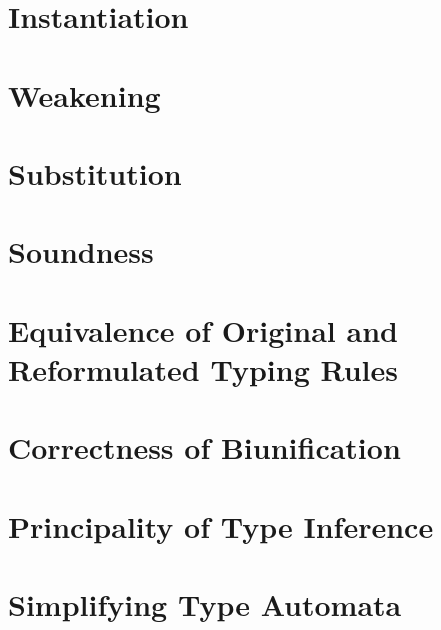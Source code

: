 \section{Instantiation}

\section{Weakening}

\section{Substitution}

\section{Soundness}

\section{Equivalence of Original and Reformulated Typing Rules}

\section{Correctness of Biunification}

\section{Principality of Type Inference}

\section{Simplifying Type Automata}
